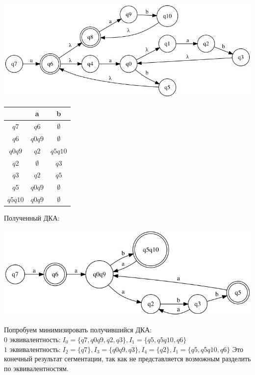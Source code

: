 \documentclass[a4paper,12pt]{article}
\begin{document}
\begin{center}
\includegraphics[width=1.15\textwidth]{3_2_nka}\newline
\end{center}
\begin{center}
\begin{tabular}{ |c|c|c| } 
\hline
  & a & b \\ [0.5ex] 
 \hline
$q7$ & $q6$ & $\emptyset$ \\
$q6$ & $q0q9$ & $\emptyset$ \\
$q0q9$ & $q2$ & $q5q10$ \\
$q2$ & $\emptyset$ & $q3$ \\
$q3$ & $q2$ & $q5$ \\
$q5$ & $q0q9$ & $\emptyset$ \\
$q5q10$ & $q0q9$ & $\emptyset$ \\
 \hline
\end{tabular}
\end{center}
Полученный ДКА:
\begin{center}
\includegraphics[width=1.15\textwidth]{3_2}\newline
\end{center}
Попробуем минимизировать получившийся ДКА:\newline
$\text{0 эквивалентность:} \; I_0=\{q7,q0q9,q2,q3\},I_1=\{q5,q5q10,q6\}$
$\text{1 эквивалентность:} \; I_2=\{q7\},I_3=\{q0q9,q3\},I_4=\{q2\},I_1=\{q5,q5q10,q6\}$\newline
Это конечный результат сегментации, так как не представляется возможным разделить по эквивалентностям.
\end{document}
